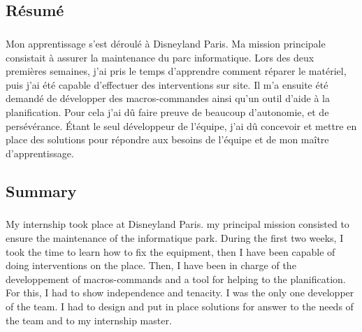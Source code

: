 \chapter*{}

\section*{{\huge Résumé}}
\paragraph{}
Mon apprentissage s'est déroulé à Disneyland Paris. Ma mission principale consistait à assurer la maintenance du parc informatique. Lors des deux premières semaines, j'ai pris le temps d'apprendre comment réparer le matériel, puis j'ai été capable d'effectuer des interventions sur site.
Il m'a ensuite été demandé de développer des macros-commandes ainsi qu'un outil d'aide à la planification. Pour cela j'ai dû faire preuve de beaucoup d'autonomie, et de persévérance. Étant le seul développeur de l'équipe, j'ai dû concevoir et mettre en place des solutions pour répondre aux besoins de l'équipe et de mon maître d'apprentissage.


\section*{{\huge Summary}}

\paragraph{}
My internship took place at Disneyland Paris. my principal mission consisted to ensure the maintenance of the informatique park. During the first two weeks, I took the time to learn how to fix the equipment, then I have been capable of doing interventions on the place.
Then, I have been in charge of the developpement of macros-commands and a tool for helping to the planification. For this, I had to show independence and tenacity. I was the only one developper of the team. I had to design and put in place solutions for answer to the needs of the team and to my internship master.
